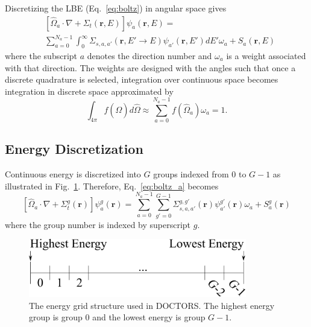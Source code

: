 Discretizing the LBE (Eq.~\ref{eq:boltz}) in angular space gives
\begin{equation} \label{eq:boltz_a}
\begin{split}
&\left[ \hat{\Omega}_a \cdot \nabla + \Sigma_t(\boldsymbol{r}, E) \right]
\psi_{a}(\boldsymbol{r}, E) = \\
&\sum_{a=0}^{N_a-1} \int_0^\infty \Sigma_{s, a, a'}(\boldsymbol{r}, E' \rightarrow E) \psi_{a'}(\boldsymbol{r}, E') dE' \omega_a + S_a(\boldsymbol{r}, E)
\end{split}
\end{equation}
where the subscript $a$ denotes the direction number and $\omega_a$ is a weight associated with that direction. The weights are designed with the angles such that once a discrete quadrature is selected, integration over continuous space becomes integration in discrete space approximated by
\begin{equation} \label{eq:disc_int}
\int_{4 \pi} f(\hat{\Omega}) d\hat{\Omega} \approx \sum_{a=0}^{N_a-1} f(\hat{\Omega}_a) \omega_a = 1.
\end{equation}

\subsection{Energy Discretization}

Continuous energy is discretized into $G$ groups indexed from 0 to $G-1$ as illustrated in Fig.~\ref{fig:energy_groups}. Therefore, Eq.~\ref{eq:boltz_a} becomes
\begin{equation} \label{eq:boltz_e}
\left[ \hat{\Omega}_a \cdot \nabla + \Sigma_t^g(\boldsymbol{r}) \right]
\psi_{a}^{g}(\boldsymbol{r}) = 
\sum_{a=0}^{N_a-1} \sum_{g'=0}^{G-1} \Sigma_{s, a, a'}^{g, g'}(\boldsymbol{r}) \psi_{a'}^{g'}(\boldsymbol{r}) \omega_a + S_a^g(\boldsymbol{r})
\end{equation}
where the group number is indexed by superscript $g$.

\begin{figure}[tb]
  \begin{center}
   \includegraphics[width=3.75in]{figs/energy_groups}
  \end{center}
  \caption{The energy grid structure used in DOCTORS. The highest energy group is group 0 and the lowest energy is group $G-1$.}
\label{fig:energy_groups}
\end{figure}

